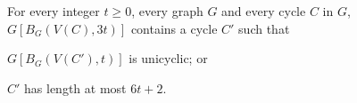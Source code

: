 \documentclass{patmorin}
\renewcommand{\ge}{\geqslant}
\renewcommand{\le}{\leqslant}
\DeclareMathOperator{\girth}{girth}
\DeclareMathOperator{\dist}{dist}
\begin{document}
%
%
%
%
%
%
%
%
%
%
%
%
%



\begin{lem}\label{short_or_unicycle_nearby}
  For every integer $t\ge 0$, every graph $G$ and every cycle $C$ in $G$,  $G[B_G(V(C),3t)]$ contains a cycle $C'$ such that
  \begin{compactenum}[(a)]
    \item $G[B_G(V(C'),t)]$ is unicyclic; or
    \item $C'$ has length at most $6t+2$.
  \end{compactenum}
\end{lem}
\end{document}
